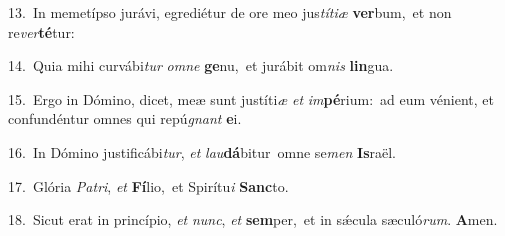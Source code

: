 {\numbfont\textcolor{\numbcolor}{13.}}~In memetípso jurávi, egrediétur de ore meo jus\-\textit{tí}\-\textit{ti}\textit{æ} \textbf{ver}\-bum,~\star et non re\-\textit{ver}\-\textbf{té}tur:\par
{\numbfont\textcolor{\numbcolor}{14.}}~Quia mihi curvábi\textit{tur} \textit{om}\-\textit{ne} \textbf{ge}\-nu,~\star et jurábit om\textit{nis} \textbf{lin}\-gua.\par
{\numbfont\textcolor{\numbcolor}{15.}}~Ergo in Dómino, dicet, meæ sunt justíti\textit{æ} \textit{et} \textit{im}\-\textbf{pé}rium:~\star ad eum vénient, et confundéntur omnes qui repú\textit{gnant} \textbf{e}\-i.\par
{\numbfont\textcolor{\numbcolor}{16.}}~In Dómino justificábi\-\textit{tur}\-, \textit{et} \textit{lau}\-\textbf{dá}bitur~\star omne se\textit{men} \textbf{Is}\-raël.\par
{\numbfont\textcolor{\numbcolor}{17.}}~Glória \textit{Pa}\-\textit{tri}, \textit{et} \textbf{Fí}\-lio,~\star et Spirítu\textit{i} \textbf{Sanc}\-to.\par
{\numbfont\textcolor{\numbcolor}{18.}}~Sicut erat in princípio, \textit{et} \textit{nunc}\-, \textit{et} \textbf{sem}\-per,~\star et in sǽcula sæculó\-\textit{rum}\-. \textbf{A}\-men.\par
